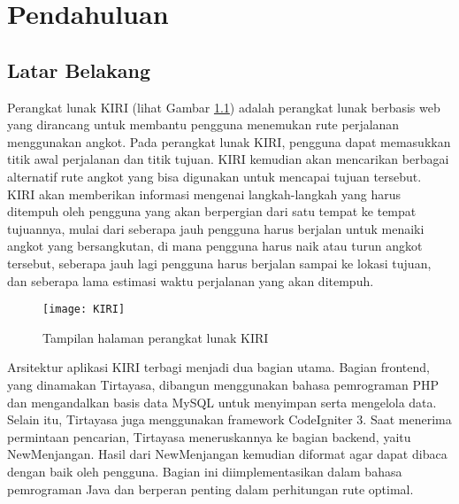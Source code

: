 \chapter{Pendahuluan}
\label{chap:intro}
   
\section{Latar Belakang}
\label{sec:label}

Perangkat lunak KIRI (lihat Gambar \ref{fig:kiri}) adalah perangkat lunak berbasis web yang dirancang untuk membantu pengguna menemukan rute perjalanan menggunakan angkot. Pada perangkat lunak KIRI, pengguna dapat memasukkan titik awal perjalanan dan titik tujuan. KIRI kemudian akan mencarikan berbagai alternatif rute angkot yang bisa digunakan untuk mencapai tujuan tersebut. KIRI akan memberikan informasi mengenai langkah-langkah yang harus ditempuh oleh pengguna yang akan berpergian dari satu tempat ke tempat tujuannya, mulai dari seberapa jauh pengguna harus berjalan untuk menaiki angkot yang bersangkutan, di mana pengguna harus naik atau turun angkot tersebut, seberapa jauh lagi pengguna harus berjalan sampai ke lokasi tujuan, dan seberapa lama estimasi waktu perjalanan yang akan ditempuh.
\begin{figure}[h] 
	\centering  
	\texttt{[image: KIRI]}  
	\caption{Tampilan halaman perangkat lunak KIRI}
	\label{fig:kiri} 
\end{figure}
\newpage
\noindent
Arsitektur aplikasi KIRI terbagi menjadi dua bagian utama. Bagian frontend, yang dinamakan Tirtayasa, dibangun menggunakan bahasa pemrograman PHP dan mengandalkan basis data MySQL untuk menyimpan serta mengelola data. Selain itu, Tirtayasa juga menggunakan framework CodeIgniter 3. Saat menerima permintaan pencarian, Tirtayasa meneruskannya ke bagian backend, yaitu NewMenjangan. Hasil dari NewMenjangan kemudian diformat agar dapat dibaca dengan baik oleh pengguna. Bagian ini diimplementasikan dalam bahasa pemrograman Java dan berperan penting dalam perhitungan rute optimal.
\\
